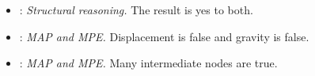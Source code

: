 \begingroup\footnotesize\raggedright
\begin{itemize}[nosep,leftmargin=*]
\item {}: \emph{Structural reasoning.}  The result is yes to both.
\item {}: \emph{MAP and MPE.}  Displacement is false and gravity is false.
\item {}: \emph{MAP and MPE.}  Many intermediate nodes are true.
\end{itemize}
\endgroup
